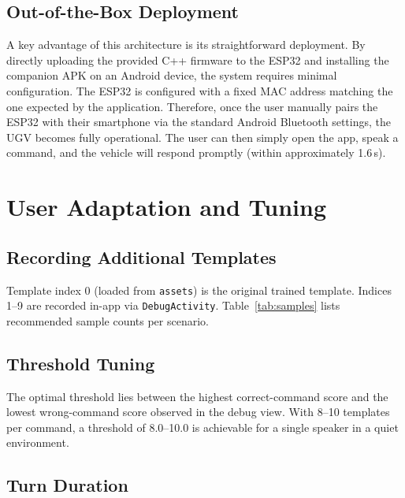 \documentclass[conference]{IEEEtran}
\begin{document}
\subsection{Out-of-the-Box Deployment}
A key advantage of this architecture is its straightforward deployment. By directly uploading the provided C++ firmware to the ESP32 and installing the companion APK on an Android device, the system requires minimal configuration. The ESP32 is configured with a fixed MAC address matching the one expected by the application. Therefore, once the user manually pairs the ESP32 with their smartphone via the standard Android Bluetooth settings, the UGV becomes fully operational. The user can then simply open the app, speak a command, and the vehicle will respond promptly (within approximately 1.6\,s).

\section{User Adaptation and Tuning} \label{sec:tuning}

\subsection{Recording Additional Templates}

Template index 0 (loaded from \texttt{assets}) is the original trained
template. Indices 1--9 are recorded in-app via \texttt{DebugActivity}.
Table~\ref{tab:samples} lists recommended sample counts per scenario.



\subsection{Threshold Tuning}

The optimal threshold lies between the highest correct-command score
and the lowest wrong-command score observed in the debug view. With
8--10 templates per command, a threshold of 8.0--10.0 is achievable
for a single speaker in a quiet environment.

\subsection{Turn Duration}
\end{document}
